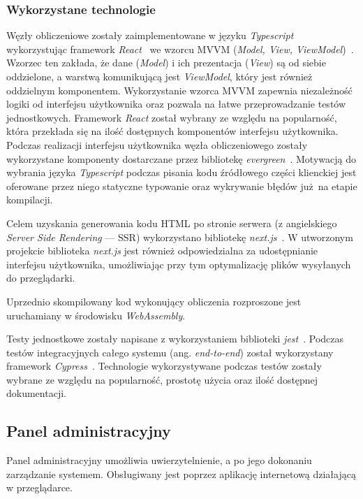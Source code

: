 \documentclass[a4paper,11pt,twoside]{report}
\theoremstyle{definition}
\begin{document}
\subsubsection{Wykorzystane technologie}
Węzły obliczeniowe zostały zaimplementowane w języku \textit{Typescript}~\cite{typescript} wykorzystując framework \textit{React}~\cite{react} we wzorcu MVVM (\textit{Model, View, ViewModel})~\cite{mvvm}.
Wzorzec ten zakłada, że dane (\textit{Model}) i ich prezentacja (\textit{View}) są od siebie oddzielone, a warstwą komunikującą jest \textit{ViewModel}, który jest również oddzielnym komponentem.
Wykorzystanie wzorca MVVM zapewnia niezależność logiki od interfejsu użytkownika oraz pozwala na łatwe przeprowadzanie testów jednostkowych.
Framework \textit{React} został wybrany ze względu na popularność, która przekłada się na ilość dostępnych komponentów interfejsu użytkownika.
Podczas realizacji interfejsu użytkownika węzła obliczeniowego zostały wykorzystane komponenty dostarczane przez bibliotekę \textit{evergreen}~\cite{evergreen}.
Motywacją do wybrania języka \textit{Typescript} podczas pisania kodu źródłowego części klienckiej jest oferowane przez niego statyczne typowanie oraz wykrywanie błędów już na etapie kompilacji.

Celem uzyskania generowania kodu HTML po stronie serwera (z angielskiego \textit{Server Side Rendering} --- SSR) wykorzystano bibliotekę \textit{next.js}~\cite{next.js}. W utworzonym projekcie biblioteka \textit{next.js} jest również odpowiedzialna za udostępnianie interfejsu użytkownika, umożliwiając przy tym optymalizację plików wysyłanych do przeglądarki.

Uprzednio skompilowany kod wykonujący obliczenia rozproszone jest uruchamiany w środowisku \textit{WebAssembly}.

Testy jednostkowe zostały napisane z wykorzystaniem biblioteki \textit{jest}~\cite{jest}. Podczas testów integracyjnych całego systemu (ang. \textit{end-to-end}) został wykorzystany framework \textit{Cypress}~\cite{cypress}. Technologie wykorzystywane podczas testów zostały wybrane ze względu na popularność, prostotę użycia oraz ilość dostępnej dokumentacji.

\subsection{Panel administracyjny}

Panel administracyjny umożliwia uwierzytelnienie, a po jego dokonaniu zarządzanie systemem. Obsługiwany jest poprzez aplikację internetową działającą w przeglądarce.
\end{document}
